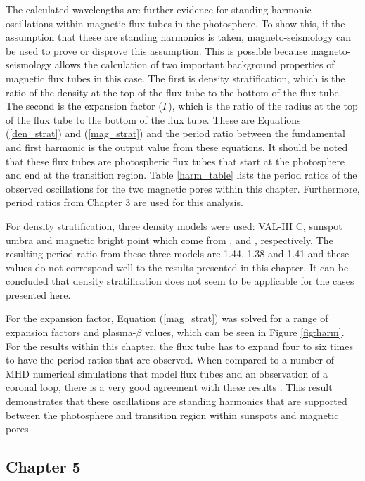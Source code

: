    The calculated wavelengths are further evidence for standing harmonic oscillations within magnetic flux tubes in the photosphere.
    To show this, if the assumption that these are standing harmonics is taken, magneto-seismology can be used to prove or disprove this assumption.
    This is possible because magneto-seismology allows the calculation of two important background properties of magnetic flux tubes in this case.
    The first is density stratification, which is the ratio of the density at the top of the flux tube to the bottom of the flux tube.
    The second is the expansion factor ($\Gamma$), which is the ratio of the radius at the top of the flux tube to the bottom of the flux tube.
    These are Equations (\ref{den_strat}) and (\ref{mag_strat}) and the period ratio between the fundamental and first harmonic is the output value from these equations.
    It should be noted that these flux tubes are photospheric flux tubes that start at the photosphere and end at the transition region.
    Table \ref{harm_table} lists the period ratios of the observed oscillations for the two magnetic pores within this chapter.
    Furthermore, period ratios from Chapter 3 are used for this analysis.

	For density stratification, three density models were used: VAL-III C, sunspot umbra and magnetic bright point which come from \cite{1981ApJS...45..635V}, \cite{Maltby1986} and \cite{GFME13a,GFE14}, respectively.
	The resulting period ratio from these three models are 1.44, 1.38 and 1.41 and these values do not correspond well to the results presented in this chapter.
	It can be concluded that density stratification does not seem to be applicable for the cases presented here.

	For the expansion factor, Equation (\ref{mag_strat}) was solved for a range of expansion factors and plasma-$\beta$ values, which can be seen in Figure \ref{fig:harm}.
	For the results within this chapter, the flux tube has to expand four to six times to have the period ratios that are observed.
	When compared to a number of MHD numerical simulations that model flux tubes and an observation of a coronal loop, there is a very good agreement with these results \citep{khomenko,fedun2,fedun1,2008A&A...489L..57K}.
	This result demonstrates that these oscillations are standing harmonics that are supported between the photosphere and transition region within sunspots and magnetic pores.

	\subsection{Chapter 5}
    
